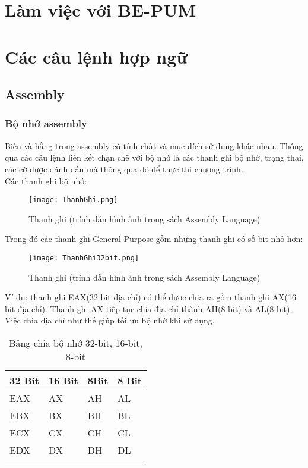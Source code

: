 \section{Làm việc với BE-PUM}

\section{Các câu lệnh hợp ngữ}

	\subsection{Assembly}
	
		\subsubsection{Bộ nhớ assembly}	
		 Biến và hằng trong assembly có tính chất và mục đích sử dụng khác nhau. Thông qua các câu lệnh liên kết chặn chẽ với bộ nhớ là các thanh ghi bộ nhớ, trạng thai, các cờ được đánh dấu mà thông qua đó để thực thi chương trình.\\

		Các thanh ghi bộ nhớ:		
		\begin{center}
			\begin{figure}[htp]
				\begin{center}
					\texttt{[image: ThanhGhi.png]}
				\end{center}
				\caption{Thanh ghi (trính dẫn hình ảnh trong sách Assembly Language)}
				\label{fig:Flow}
			\end{figure}
		\end{center}
		
		Trong đó các thanh ghi General-Purpose gồm những thanh ghi có số bit nhỏ hơn:	
		\begin{center}
			\begin{figure}[htp]
				\begin{center}
					\texttt{[image: ThanhGhi32bit.png]}
				\end{center}
				\caption{Thanh ghi (trính dẫn hình ảnh trong sách Assembly Language)}
				\label{fig:Flow}
			\end{figure}
		\end{center}
		
		Ví dụ: thanh ghi EAX(32 bit địa chỉ) có thể được chia ra gồm thanh ghi AX(16 bit địa chỉ). Thanh ghi AX tiếp tục chia địa chỉ thành AH(8 bit) và AL(8 bit). Việc chia địa chỉ như thế giúp tối ưu bộ nhớ khi sử dụng.\\
		\begin{longtable}{ | m{3cm} | m{3cm} | m{3cm}  | m{3cm}| }
			\hline
				32 Bit & 16 Bit & 8Bit & 8 Bit\\
			\hline
			\hline
				EAX & AX	& AH	 & AL\\
			\hline			
				EBX & BX	& BH	 & BL\\
			\hline		
				ECX & CX	& CH	 & CL\\		
			\hline
				EDX & DX	& DH	 & DL\\
			\hline
			\caption{Bảng chia bộ nhớ 32-bit, 16-bit, 8-bit}
			\label{table:tbthanhghi}
		\end{longtable}
		
